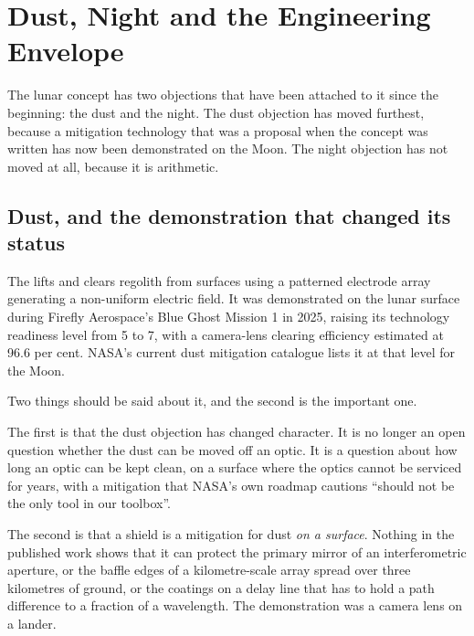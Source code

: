 
\chapter{Dust, Night and the Engineering Envelope}
\label{ch:envelope}

The lunar concept has two objections that have been attached to it since
the beginning: the dust and the night. The dust objection has moved
furthest, because a mitigation technology that was a proposal when the
concept was written has now been demonstrated on the Moon. The night
objection has not moved at all, because it is arithmetic.

\section{Dust, and the demonstration that changed its status}

The  lifts and clears regolith from surfaces using
a patterned electrode array generating a non-uniform electric field. It was
demonstrated on the lunar surface during Firefly Aerospace's Blue Ghost
Mission 1 in 2025, raising its technology readiness level from 5 to 7, with
a camera-lens clearing efficiency estimated at 96.6 per cent. NASA's current
dust mitigation catalogue lists it at that level for the Moon.

Two things should be said about it, and the second is the important one.

The first is that the dust objection has changed character. It is no longer
an open question whether the dust can be moved off an optic. It is a
question about how long an optic can be kept clean, on a surface where the
optics cannot be serviced for years, with a mitigation that NASA's own
roadmap cautions ``should not be the only tool in our toolbox''.

The second is that a shield is a mitigation for dust \emph{on a surface}.
Nothing in the published work shows that it can protect the primary mirror of
an interferometric aperture, or the baffle edges of a kilometre-scale array
spread over three kilometres of ground, or the coatings on a delay line that
has to hold a path difference to a fraction of a wavelength. The
demonstration was a camera lens on a lander.

